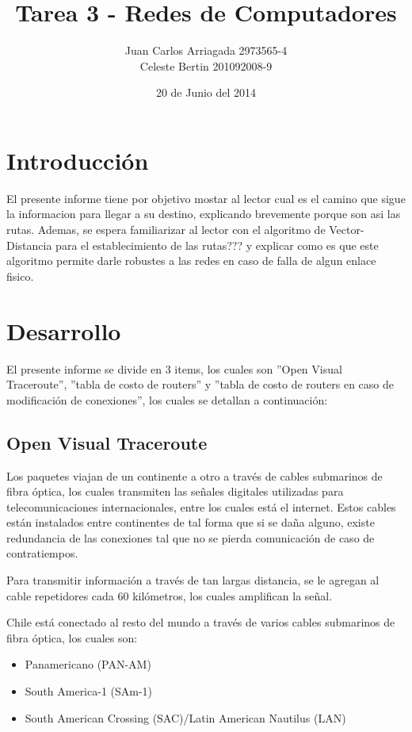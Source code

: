\documentclass{article}
\title{Tarea 3 - Redes de Computadores}
\author{Juan Carlos Arriagada 2973565-4\\Celeste Bertin 201092008-9}
\date{20 de Junio del 2014}
\begin{document}
\maketitle

\section{Introducción}
El presente informe tiene por objetivo mostar al lector cual es el camino que sigue la informacion para llegar a su destino, explicando brevemente porque son asi las rutas. Ademas, se espera familiarizar al lector con el algoritmo de Vector-Distancia para el establecimiento de las rutas??? y explicar como es que este algoritmo permite darle robustes a las redes en caso de falla de algun enlace fisico.

\section{Desarrollo}
El presente informe se divide en 3 items, los cuales son ''Open Visual Traceroute'', ''tabla de costo de routers'' y ''tabla de costo de routers en caso de modificación de conexiones'', los cuales se detallan a continuación:

\subsection{Open Visual Traceroute }
Los paquetes viajan de un continente a otro a través de cables submarinos de fibra óptica, los cuales transmiten las señales digitales utilizadas para telecomunicaciones internacionales, entre los cuales está el internet. Estos cables están instalados entre continentes de tal forma que si se daña alguno, existe redundancia de las conexiones tal que no se pierda comunicación de caso de contratiempos. 

Para transmitir información a través de tan largas distancia, se le agregan al cable repetidores cada 60 kilómetros, los cuales amplifican la señal\citep{website:cablestransoceanicos}.

Chile está conectado al resto del mundo a través de varios cables submarinos de fibra óptica\citep{website:telegeography}, los cuales son:
\begin{itemize}
  \item Panamericano (PAN-AM)
  \item South America-1 (SAm-1)
  \item South American Crossing (SAC)/Latin American Nautilus (LAN)
\end{itemize}
\end{document}
